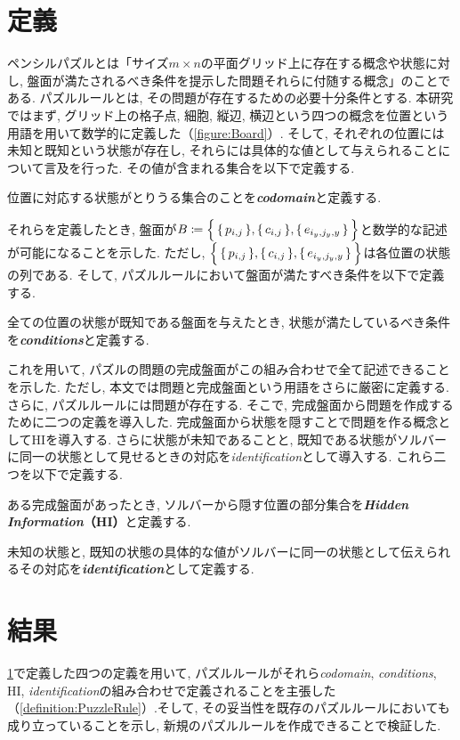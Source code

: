 \section{定義}\label{section:IntroDefinition}
ペンシルパズルとは「サイズ$m\times n$の平面グリッド上に存在する概念や状態に対し, 盤面が満たされるべき条件を提示した問題それらに付随する概念」のことである. パズルルールとは, その問題が存在するための必要十分条件とする. 本研究ではまず, グリッド上の格子点, 細胞, 縦辺, 横辺という四つの概念を位置という用語を用いて数学的に定義した（\cref{figure:Board}）. そして, それぞれの位置には未知と既知という状態が存在し, それらには具体的な値として与えられることについて言及を行った. その値が含まれる集合を以下で定義する.
\begin{definition}
	位置に対応する状態がとりうる集合のことを\textbf{\textit{codomain}}と定義する.
\end{definition}
それらを定義したとき, 盤面が$B\coloneqq\Bigl\{\,\{\,p_{i,j}\,\},\{\,c_{i,j}\,\},\{\,e_{i_y,j_y,y}\,\}\,\Bigr\}$と数学的な記述が可能になることを示した.  ただし, $\Bigl\{\,\{\,p_{i,j}\,\},\{\,c_{i,j}\,\},\{\,e_{i_y,j_y,y}\,\}\,\Bigr\}$は各位置の状態の列である. そして, パズルルールにおいて盤面が満たすべき条件を以下で定義する.
\begin{definition}
	全ての位置の状態が既知である盤面を与えたとき, 状態が満たしているべき条件を\textbf{\textit{conditions}}と定義する.
\end{definition}
これを用いて, パズルの問題の完成盤面がこの組み合わせで全て記述できることを示した. ただし, 本文では問題と完成盤面という用語をさらに厳密に定義する. さらに, パズルルールには問題が存在する. そこで, 完成盤面から問題を作成するために二つの定義を導入した. 完成盤面から状態を隠すことで問題を作る概念としてHIを導入する. さらに状態が未知であることと, 既知である状態がソルバーに同一の状態として見せるときの対応を\textit{identification}として導入する. これら二つを以下で定義する.
\begin{definition}
	ある完成盤面があったとき, ソルバーから隠す位置の部分集合を\textbf{\textit{Hidden Information}（HI）}と定義する.
\end{definition}
\begin{definition}
	未知の状態と, 既知の状態の具体的な値がソルバーに同一の状態として伝えられるその対応を\textbf{\textit{identification}}として定義する.
\end{definition}

\section{結果}
\cref{section:IntroDefinition}で定義した四つの定義を用いて, パズルルールがそれら\textit{codomain}, \textit{conditions}, HI, \textit{identification}の組み合わせで定義されることを主張した（\cref{definition:PuzzleRule}）.そして, その妥当性を既存のパズルルールにおいても成り立っていることを示し, 新規のパズルルールを作成できることで検証した.
